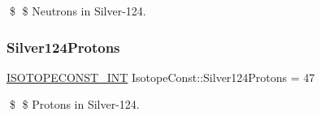 \$ \$ Neutrons in Silver-\/124. \mbox{\label{group___isotope_const-_silver-_ag124_gafad60038050f11890351ad79ebe20351}} 
\subsubsection{\texorpdfstring{Silver124\+Protons}{Silver124Protons}}
{\footnotesize\ttfamily \mbox{\hyperlink{group___isotope_const-_macros_ga5f18360b3e99483a35c32d789e62621c}{I\+S\+O\+T\+O\+P\+E\+C\+O\+N\+S\+T\+\_\+\+I\+NT}} Isotope\+Const\+::\+Silver124\+Protons = 47}

\$ \$ Protons in Silver-\/124. 